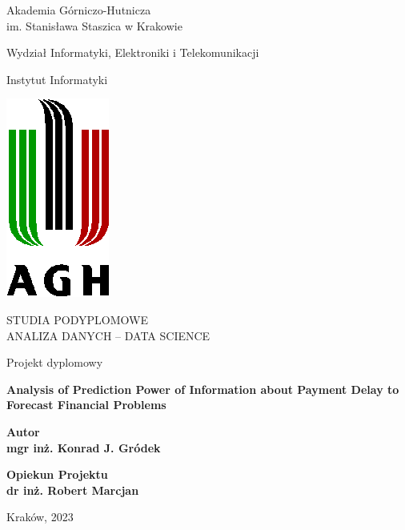 \documentclass{article}
\begin{document}
\begin{titlepage}
    \begin{center}
        \vspace*{1cm}

        \huge{Akademia Górniczo-Hutnicza}\\
        \large{im. Stanisława Staszica w Krakowie}

        \vspace{0.5cm}

        \large{Wydział Informatyki, Elektroniki i Telekomunikacji}

        \vspace{0.5cm}

        \large{Instytut Informatyki}

        \vspace{1cm}

        \includegraphics{img/agh.png}

        \vspace{1cm}

        \large\textsc{STUDIA PODYPLOMOWE
        \\ANALIZA DANYCH – DATA SCIENCE}

        \vspace{1cm}
        \large{Projekt dyplomowy}

        \vspace{0.8cm}

        \textbf{Analysis of Prediction Power of Information about Payment Delay to Forecast Financial Problems}

        \vspace{1.5cm}

        \textbf{Autor}\\
        \textbf{mgr inż. Konrad J. Gródek}

        \vspace{0.8cm}
        \textbf{Opiekun Projektu}\\
        \textbf{dr inż. Robert Marcjan}


        \vfill

        \large{Kraków, 2023}

        \end{center}
    \end{titlepage}
\end{document}
